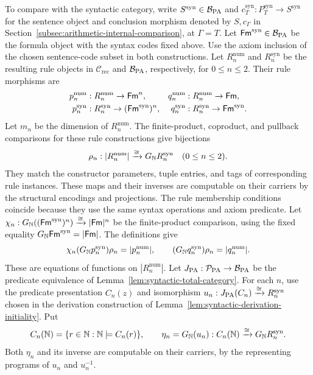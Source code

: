 To compare with the syntactic category, write
$S^{\mathrm{syn}}\in\mathcal B_{\mathrm{PA}}$ and
$c_T^{\mathrm{syn}}:P_T^{\mathrm{syn}}\to S^{\mathrm{syn}}$
for the sentence object and conclusion morphism denoted by $S,c_\Gamma$
in Section~\ref{subsec:arithmetic-internal-comparison}, at $\Gamma=T$.
Let $\mathsf{Fm}^{\mathrm{syn}}\in\mathcal B_{\mathrm{PA}}$ be the formula object
with the syntax codes fixed above. Use the axiom inclusion of the
chosen sentence-code subset in both constructions. Let
$R_n^{\mathrm{num}}$ and $R_n^{\mathrm{syn}}$ be the resulting
rule objects in $\mathcal C_{\mathrm{rec}}$ and $\mathcal B_{\mathrm{PA}}$,
respectively, for $0\le n\le2$. Their rule morphisms are
\[
 \begin{aligned}
 p_n^{\mathrm{num}}&:R_n^{\mathrm{num}}\to\mathsf{Fm}^n,&
 q_n^{\mathrm{num}}&:R_n^{\mathrm{num}}\to\mathsf{Fm},\\
 p_n^{\mathrm{syn}}&:R_n^{\mathrm{syn}}\to(\mathsf{Fm}^{\mathrm{syn}})^n,&
 q_n^{\mathrm{syn}}&:R_n^{\mathrm{syn}}\to\mathsf{Fm}^{\mathrm{syn}}.
 \end{aligned}
\]
Let $m_n$ be the dimension of $R_n^{\mathrm{num}}$.
The finite-product, coproduct, and pullback comparisons for these
rule constructions give bijections
\[
 \rho_n:|R_n^{\mathrm{num}}|\xrightarrow{\cong}
                  G_{\mathbb N}R_n^{\mathrm{syn}}\quad(0\le n\le2).
\]
They match the constructor parameters, tuple entries, and tags of
corresponding rule instances. These maps and their inverses are
computable on their carriers by the structural encodings and projections.
The rule membership conditions coincide because they use the same
syntax operations and axiom predicate. Let
$\chi_n:G_{\mathbb N}((\mathsf{Fm}^{\mathrm{syn}})^n)\xrightarrow{\cong}|\mathsf{Fm}|^n$
be the finite-product comparison, using the fixed equality
$G_{\mathbb N}\mathsf{Fm}^{\mathrm{syn}}=|\mathsf{Fm}|$. The definitions give
\[
 \chi_n(G_{\mathbb N}p_n^{\mathrm{syn}})\rho_n=|p_n^{\mathrm{num}}|,
 \qquad
 (G_{\mathbb N}q_n^{\mathrm{syn}})\rho_n=|q_n^{\mathrm{num}}|.
\]
These are equations of functions on $|R_n^{\mathrm{num}}|$.
Let $J_{\mathrm{PA}}:\mathcal P_{\mathrm{PA}}\to\mathcal B_{\mathrm{PA}}$ be the
predicate equivalence of Lemma~\ref{lem:syntactic-total-category}.
For each $n$, use the predicate presentation $C_n(z)$ and
isomorphism $u_n:J_{\mathrm{PA}}(C_n)\xrightarrow{\cong}R_n^{\mathrm{syn}}$
chosen in the derivation construction of
Lemma~\ref{lem:syntactic-derivation-initiality}. Put
\[
 C_n(\mathbb N)=\{r\in\mathbb N:\mathbb N\models C_n(r)\},\qquad
 \eta_n=G_{\mathbb N}(u_n):C_n(\mathbb N)\xrightarrow{\cong}
                                      G_{\mathbb N}R_n^{\mathrm{syn}}.
\]
Both $\eta_n$ and its inverse are computable on their carriers,
by the representing programs of $u_n$ and $u_n^{-1}$.
